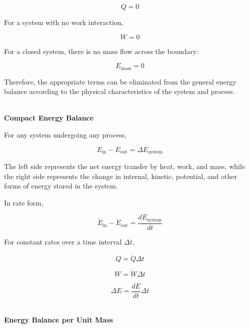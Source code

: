 \documentclass[12pt]{article}
\begin{document}
\begin{equation*}
Q=0
\end{equation*}

For a system with no work interaction,

\begin{equation*}
W=0
\end{equation*}

For a closed system, there is no mass flow across the boundary:

\begin{equation*}
E_{\mathrm{mass}}=0
\end{equation*}

Therefore, the appropriate terms can be eliminated from the general energy balance according to the physical characteristics of the system and process. 

\textbf{\\ Compact Energy Balance}

For any system undergoing any process,

\begin{equation*}
E_{\mathrm{in}}-E_{\mathrm{out}}
=
\Delta E_{\mathrm{system}}
\end{equation*}

The left side represents the net energy transfer by heat, work, and mass, while the right side represents the change in internal, kinetic, potential, and other forms of energy stored in the system.

In rate form,

\begin{equation*}
\dot{E}_{\mathrm{in}}-\dot{E}_{\mathrm{out}}
=
\frac{dE_{\mathrm{system}}}{dt}
\end{equation*}

For constant rates over a time interval $\Delta t$,

\begin{equation*}
Q=\dot{Q}\Delta t
\end{equation*}

\begin{equation*}
W=\dot{W}\Delta t
\end{equation*}

\begin{equation*}
\Delta E
=
\frac{dE}{dt}\Delta t
\end{equation*}



\textbf{\\ Energy Balance per Unit Mass}
\end{document}
